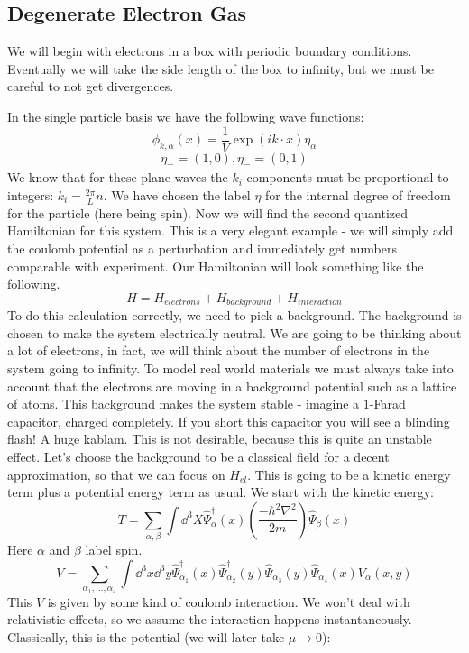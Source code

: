 \documentclass{article}
\begin{document}
\subsection{Degenerate Electron Gas}
We will begin with electrons in a box with periodic boundary conditions. Eventually we will take the side length of the box to infinity, but we must be careful to not get divergences.

In the single particle basis we have the following wave functions:
\[\phi_{k,\alpha}(x)=\frac{1}{V}\exp\left(ik\cdot x\right)\eta_\alpha\]
\[\eta_+ = (1,0), \eta_-=(0,1)\]
We know that for these plane waves the $k_i$ components must be proportional to integers: $k_i =\frac{2\pi}{L}n$. We have chosen the label $\eta$ for the internal degree of freedom for the particle (here being spin). Now we will find the second quantized Hamiltonian for this system. This is a very elegant example - we will simply add the coulomb potential as a perturbation and immediately get numbers comparable with experiment. Our Hamiltonian will look something like the following.
\begin{equation}
    H = H_{electrons}+H_{background}+H_{interaction}
\end{equation}
To do this calculation correctly, we need to pick a background. The background is chosen to make the system electrically neutral. We are going to be thinking about a lot of electrons, in fact, we will think about the number of electrons in the system going to infinity. To model real world materials we must always take into account that the electrons are moving in a background potential such as a lattice of atoms. This background makes the system stable - imagine a $1$-Farad capacitor, charged completely. If you short this capacitor you will see a blinding flash! A huge kablam. This is not desirable, because this is quite an unstable effect. Let's choose the background to be a classical field for a decent approximation, so that we can focus on $H_{el}$. This is going to be a kinetic energy term plus a potential energy term as usual. We start with the kinetic energy:
\[T = \sum_{\alpha, \beta}\int \dd^3 X \hat\Psi^\dagger_\alpha(x)\left(\frac{-\hbar^2\nabla^2}{2m}\right)\hat\Psi_\beta(x)\]
Here $\alpha$ and $\beta$ label spin.
\[V = \sum_{\alpha_1,...,\alpha_4}\int \dd^3 x\dd^3 y \hat\Psi_{\alpha_1}^\dagger(x)\hat\Psi_{\alpha_2}^\dagger(y)\hat\Psi_{\alpha_3}(y)\hat\Psi_{\alpha_4}(x)V_{\alpha}(x,y)\]
This $V$ is given by some kind of coulomb interaction. We won't deal with relativistic effects, so we assume the interaction happens instantaneously. Classically, this is the potential (we will later take $\mu \to 0$):
\end{document}
